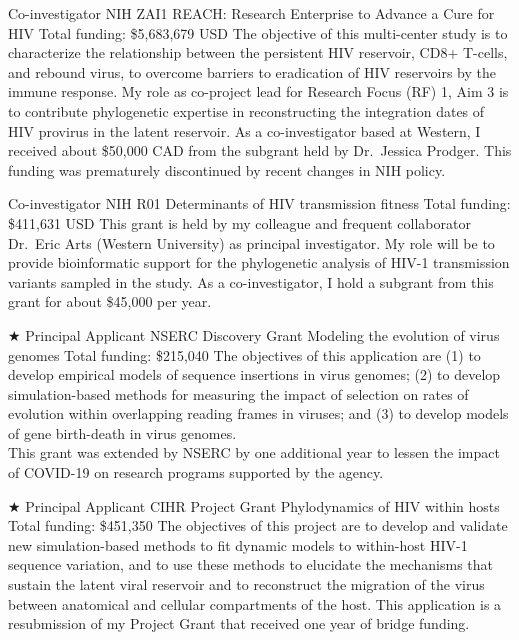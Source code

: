 {Co-investigator}
{NIH ZAI1}  %
{REACH: Research Enterprise to Advance a Cure for HIV}
{Total funding: \$5,683,679 USD}
{
The objective of this multi-center study is to characterize the relationship between the persistent HIV reservoir, CD8+ T-cells, and rebound virus, to overcome barriers to eradication of HIV reservoirs by the immune response. 
My role as co-project lead for Research Focus (RF) 1, Aim 3 is to contribute phylogenetic expertise in reconstructing the integration dates of HIV provirus in the latent reservoir. 
As a co-investigator based at Western, I received about \$50,000 CAD from the subgrant held by Dr.~Jessica Prodger.
This funding was prematurely discontinued by recent changes in NIH policy.
}


{Co-investigator}
{NIH R01}  %
{Determinants of HIV transmission fitness}
{Total funding: \$411,631 USD}
{
This grant is held by my colleague and frequent collaborator Dr.~Eric Arts (Western University) as principal investigator.
My role will be to provide bioinformatic support for the phylogenetic analysis of HIV-1 transmission variants sampled in the study.
As a co-investigator, I hold a subgrant from this grant for about \$45,000 per year.
}



{$\bigstar$ Principal Applicant}
{NSERC Discovery Grant}
{Modeling the evolution of virus genomes}
{Total funding: \$215,040} %
{
The objectives of this application are (1) to develop empirical models of sequence insertions in virus genomes; (2) to develop simulation-based methods for measuring the impact of selection on rates of evolution within overlapping reading frames in viruses; and (3) to develop models of gene birth-death in virus genomes.\\
This grant was extended by NSERC by one additional year to lessen the impact of COVID-19 on research programs supported by the agency.
}



{$\bigstar$ Principal Applicant}
{CIHR Project Grant} %
{Phylodynamics of HIV within hosts}
{Total funding: \$451,350}
{
The objectives of this project are to develop and validate new simulation-based methods to fit dynamic models to within-host HIV-1 sequence variation, and to use these methods to elucidate the mechanisms that sustain the latent viral reservoir and to reconstruct the migration of the virus between anatomical and cellular compartments of the host.
This application is a resubmission of my Project Grant that received one year of bridge funding.\\ 
}


